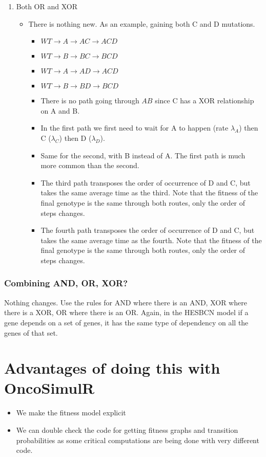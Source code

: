 \documentclass[11pt]{article}
\begin{document}
\begin{enumerate}
\item Both OR and XOR
\label{sec:org5edd44b}
\begin{itemize}
\item There is nothing new. As an example, gaining both C and D mutations.
\begin{itemize}
\item \(WT \rightarrow A \rightarrow AC \rightarrow ACD\)
\item \(WT \rightarrow B \rightarrow BC \rightarrow BCD\)
\item \(WT \rightarrow A \rightarrow AD \rightarrow ACD\)
\item \(WT \rightarrow B \rightarrow BD \rightarrow BCD\)
\item There is no path going through \(AB\) since C has a XOR relationship on A and B.

\item In the first path we first need to wait for A to happen (rate \(\lambda_A\)) then C (\(\lambda_C\)) then D (\(\lambda_D\)).
\item Same for the second, with B instead of A. The first path is much more common than the second.
\item The third path transposes the order of occurrence of D and C, but takes the same average time as the third. Note that the fitness of the final genotype is the same through both routes, only the order of steps changes.
\item The fourth path transposes the order of occurrence of D and C, but takes the same average time as the fourth. Note that the fitness of the final genotype is the same through both routes, only the order of steps changes.
\end{itemize}
\end{itemize}
\end{enumerate}

\subsubsection{Combining AND, OR, XOR?}
\label{sec:org78cffb2}
Nothing changes. Use the rules for AND where there is an AND, XOR where there is a XOR, OR where there is an OR. Again, in the HESBCN model if a gene depends on a set of genes, it has the same type of dependency on all the genes of that set.




\section{Advantages of doing this with OncoSimulR}
\label{sec:org4a55091}
\begin{itemize}
\item We make the fitness model explicit
\item We can double check the code for getting fitness graphs and transition
probabilities as some critical computations are being done with very
different code.
\end{itemize}
\end{document}
